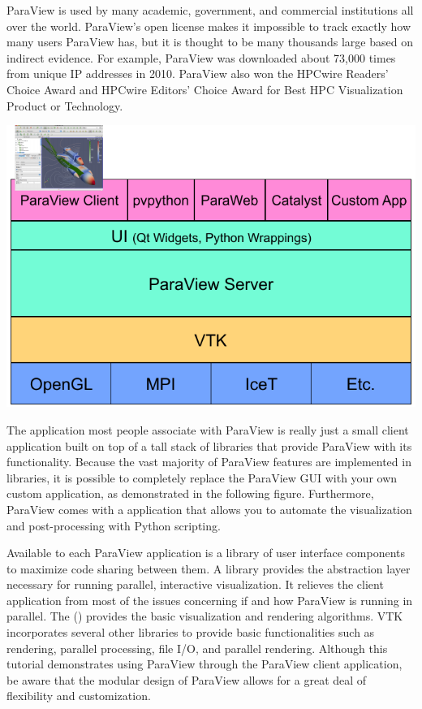 ParaView is used by many academic, government, and commercial institutions
all over the world.  ParaView's open license makes it impossible to track
exactly how many users ParaView has, but it is thought to be many thousands
large based on indirect evidence.  For example, ParaView was downloaded
about 73,000 times from unique IP addresses in 2010.  ParaView also won the
HPCwire Readers' Choice Award and HPCwire Editors' Choice Award for Best
HPC Visualization Product or Technology.

\begin{inlinefig}
  \includegraphics[scale=\bbscale]{images/ParaViewLibStack}
\end{inlinefig}

The application most people associate with ParaView is really just a small
client application built on top of a tall stack of libraries that provide
ParaView with its functionality.  Because the vast majority of ParaView
features are implemented in libraries, it is possible to completely replace
the ParaView GUI with your own custom application, as demonstrated in the
following figure.  Furthermore, ParaView comes with a 
application that allows you to automate the visualization and
post-processing with Python scripting.

Available to each ParaView application is a library of user interface
components to maximize code sharing between them.  A  library provides the abstraction layer necessary for running
parallel, interactive visualization.  It relieves the client application
from most of the issues concerning if and how ParaView is running in
parallel.  The  () provides the
basic visualization and rendering algorithms.  VTK incorporates several
other libraries to provide basic functionalities such as rendering,
parallel processing, file I/O, and parallel rendering.  Although this
tutorial demonstrates using ParaView through the ParaView client
application, be aware that the modular design of ParaView allows for a
great deal of flexibility and customization.

